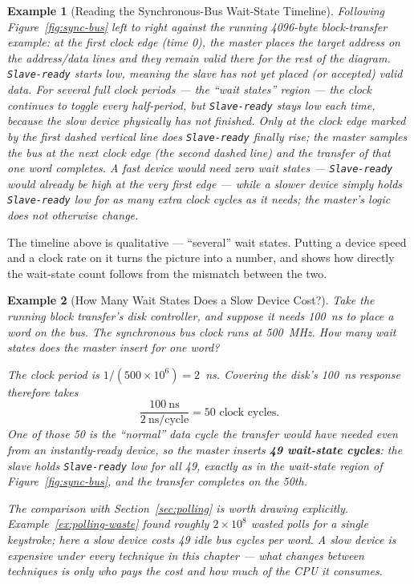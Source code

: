 \documentclass[11pt]{article}
\newtheorem{example}{Example}[section]
\begin{document}
\begin{example}[Reading the Synchronous-Bus Wait-State Timeline]
\label{ex:sync-trace}
Following Figure~\ref{fig:sync-bus} left to right against the running 4096-byte block-transfer example: at the first clock edge (time 0), the master places the target address on the address/data lines and they remain valid there for the rest of the diagram. \texttt{Slave-ready} starts low, meaning the slave has not yet placed (or accepted) valid data. For several full clock periods --- the ``wait states'' region --- the clock continues to toggle every half-period, but \texttt{Slave-ready} stays low each time, because the slow device physically has not finished. Only at the clock edge marked by the first dashed vertical line does \texttt{Slave-ready} finally rise; the master samples the bus at the \emph{next} clock edge (the second dashed line) and the transfer of that one word completes. A fast device would need zero wait states --- \texttt{Slave-ready} would already be high at the very first edge --- while a slower device simply holds \texttt{Slave-ready} low for as many extra clock cycles as it needs; the master's logic does not otherwise change.
\end{example}

The timeline above is qualitative --- ``several'' wait states. Putting a device speed and a clock rate on it turns the picture into a number, and shows how directly the wait-state count follows from the mismatch between the two.

\begin{example}[How Many Wait States Does a Slow Device Cost?]
\label{ex:wait-states}
Take the running block transfer's disk controller, and suppose it needs 100~ns to place a word on the bus. The synchronous bus clock runs at 500~MHz. How many wait states does the master insert for one word?

The clock period is $1/(500 \times 10^6) = 2$~ns. Covering the disk's 100~ns response therefore takes
\[
  \frac{100~\text{ns}}{2~\text{ns/cycle}} = 50 \text{ clock cycles.}
\]
One of those 50 is the ``normal'' data cycle the transfer would have needed even from an instantly-ready device, so the master inserts \textbf{49 wait-state cycles}: the slave holds \texttt{Slave-ready} low for all 49, exactly as in the wait-state region of Figure~\ref{fig:sync-bus}, and the transfer completes on the 50th.

The comparison with Section~\ref{sec:polling} is worth drawing explicitly. Example~\ref{ex:polling-waste} found roughly $2\times10^8$ wasted polls for a single keystroke; here a slow device costs 49 idle bus cycles per word. A slow device is expensive under \emph{every} technique in this chapter --- what changes between techniques is only \emph{who} pays the cost and \emph{how much} of the CPU it consumes.
\end{example}
\end{document}

